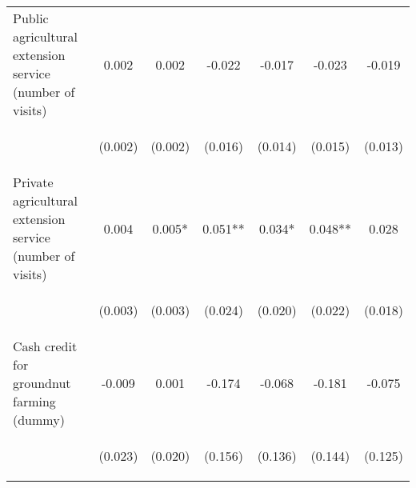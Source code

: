 \begin{center}
\begin{tabular}{lcccccc}
Public agricultural extension service (number of visits) & 0.002 & 0.002 & -0.022 & -0.017 & -0.023 & -0.019 \\
\vspace{4pt} & \begin{footnotesize}(0.002)\end{footnotesize} & \begin{footnotesize}(0.002)\end{footnotesize} & \begin{footnotesize}(0.016)\end{footnotesize} & \begin{footnotesize}(0.014)\end{footnotesize} & \begin{footnotesize}(0.015)\end{footnotesize} & \begin{footnotesize}(0.013)\end{footnotesize} \\
Private agricultural extension service (number of visits) & 0.004 & 0.005* & 0.051** & 0.034* & 0.048** & 0.028 \\
\vspace{4pt} & \begin{footnotesize}(0.003)\end{footnotesize} & \begin{footnotesize}(0.003)\end{footnotesize} & \begin{footnotesize}(0.024)\end{footnotesize} & \begin{footnotesize}(0.020)\end{footnotesize} & \begin{footnotesize}(0.022)\end{footnotesize} & \begin{footnotesize}(0.018)\end{footnotesize} \\
Cash credit for groundnut farming (dummy) & -0.009 & 0.001 & -0.174 & -0.068 & -0.181 & -0.075 \\
\vspace{4pt} & \begin{footnotesize}(0.023)\end{footnotesize} & \begin{footnotesize}(0.020)\end{footnotesize} & \begin{footnotesize}(0.156)\end{footnotesize} & \begin{footnotesize}(0.136)\end{footnotesize} & \begin{footnotesize}(0.144)\end{footnotesize} & \begin{footnotesize}(0.125)\end{footnotesize} \\

\end{tabular}
\end{center}
